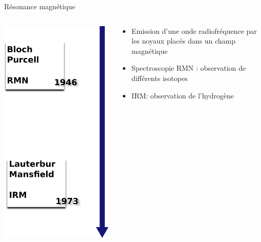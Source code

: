 \documentclass{beamer}
\begin{document}
\begin{frame}{Résonance magnétique}
\begin{columns}[T]
 \begin{column}{0.5\textwidth}
 \centering
\includegraphics[height=0.7\textheight]{images/historique_rmn.png}
 \end{column}
 \begin{column}{0.5\textwidth}
\begin{itemize}
 \item Emission d'une onde radiofréquence par les noyaux placés dans un champ magnétique
 \item Spectroscopie RMN : observation de différents isotopes
 \item IRM: observation de l'hydrogène
\end{itemize}
 \end{column}
\end{columns} 
\end{frame}
\end{document}
